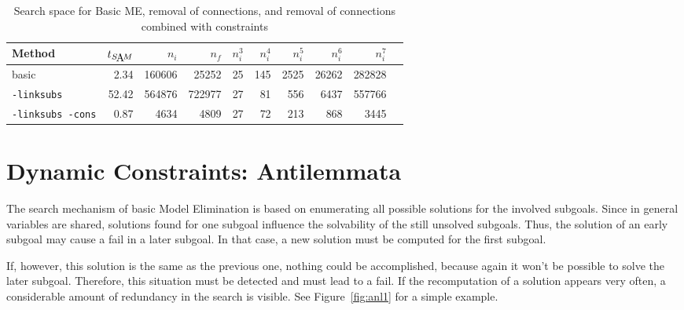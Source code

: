 \begin{table}[htb]
\begin{center}
\begin{tabular}{|l|r|r|r||r|r|r|r|r|r|}
\hline
Method & $t_{\SAM}$ & $n_i$ & $n_f$ & 
	$n_i^3$ & $n_i^4$ & $n_i^5$ & $n_i^6$ & $n_i^7$ \\
\hline\hline
basic & 2.34 & 160606 & 25252 &
	25 & 145 & 2525 & 26262 & 282828 \\
\hline
{\tt -linksubs} & 52.42 & 564876 & 722977 &
	27 & 81 & 556 & 6437 & 557766 \\
\hline
{\tt -linksubs -cons} & 0.87 & 4634 & 4809 &
	27 & 72 & 213 & 868 & 3445 \\
\hline\hline
\end{tabular}
\end{center}
\caption{Search space for Basic ME, removal of connections, and removal of connections
combined with constraints}
\label{tab:tut2:results.linksubs}
\end{table}


\section{Dynamic Constraints: Antilemmata}\label{sec:local-failure-caching}

The search mechanism of basic Model Elimination is based on enumerating all
possible solutions for the involved subgoals. Since in general
variables are shared, solutions found for one subgoal 
influence the solvability of the still unsolved subgoals. Thus,
the solution of an early subgoal may cause a fail in a later subgoal. 
In that case, a new solution must be computed for the first subgoal.

If, however, this solution is the same as the previous one,
nothing could be accomplished, because again it won't be possible to
solve the later subgoal.
Therefore, this situation must be detected and must lead to a fail.
If the recomputation of a solution
appears very often, a considerable amount of redundancy in the search
is visible.  
See Figure~\ref{fig:anl1} for a simple example. 




